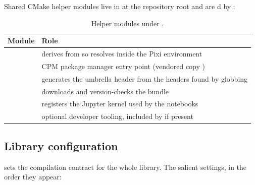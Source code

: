 Shared CMake helper modules live in  at the repository root and
are d by :

\begin{table}[H]
  \centering
  \caption{Helper modules under .}
  \label{tab:dev-cmake-modules}
  \small
  \begin{tabularx}{\textwidth}{lL}
    \toprule
    Module & Role \\
    \midrule
       & derives  from  so
                                 resolves inside the Pixi environment \\
              & CPM package manager entry point (vendored copy
                                ) \\
      & generates the umbrella header  from the
                                headers found by globbing \\
     & downloads and version-checks the  bundle \\
     & registers the Jupyter kernel used by the notebooks \\
            & optional developer tooling, included by  if present \\
    \bottomrule
  \end{tabularx}
\end{table}

\subsection{Library configuration}

 sets the compilation contract for the whole library.
The salient settings, in the order they appear:

